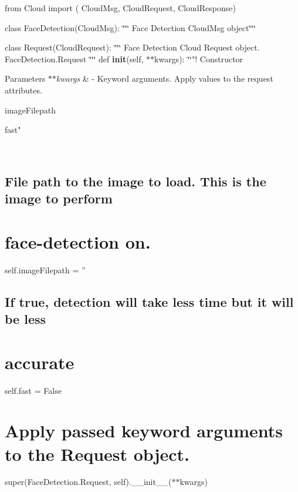 from Cloud import ( Cloud\-Msg, Cloud\-Request, Cloud\-Response)

class Face\-Detection(\-Cloud\-Msg)\-: \char`\"{}\char`\"{}\char`\"{} Face Detection Cloud\-Msg object\char`\"{}\char`\"{}\char`\"{}

class Request(\-Cloud\-Request)\-: \char`\"{}\char`\"{}\char`\"{} Face Detection Cloud Request object. Face\-Detection.\-Request \char`\"{}\char`\"{}\char`\"{} def {\bfseries init}(self, $\ast$$\ast$kwargs)\-: \char`\"{}\char`\"{}"! Constructor 
\begin{DoxyParams}{Parameters}
{\em $\ast$$\ast$kwargs} & -\/ Keyword arguments. Apply values to the request attributes.
\begin{DoxyItemize}
\item image\-Filepath
\item fast"
\end{DoxyItemize}\\
\hline
\end{DoxyParams}
\subsection*{File path to the image to load. This is the image to perform}

\section*{face-\/detection on.}

self.\-image\-Filepath = '' \subsection*{If true, detection will take less time but it will be less}

\section*{accurate}

self.\-fast = False \section*{Apply passed keyword arguments to the Request object.}

super(Face\-Detection.\-Request, self).\-\_\-\-\_\-init\-\_\-\-\_\-($\ast$$\ast$kwargs)

